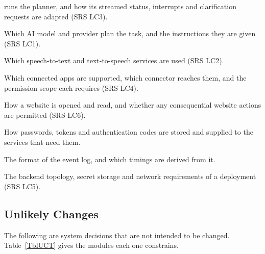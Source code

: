 \documentclass[12pt, titlepage]{article}
\newcounter{acnum}
\newcommand{\actheacnum}{AC\theacnum}
\begin{document}
\begin{description}[leftmargin=1.2cm]
runs the planner, and how its streamed status, interrupts and clarification
requests are adapted (SRS LC3).
\item[\refstepcounter{acnum} \actheacnum \label{acModel}:] Which AI model and
provider plan the task, and the instructions they are given (SRS LC1).
\item[\refstepcounter{acnum} \actheacnum \label{acSpeech}:] Which speech-to-text
and text-to-speech services are used (SRS LC2).
\item[\refstepcounter{acnum} \actheacnum \label{acAccount}:] Which connected apps
are supported, which connector reaches them, and the permission scope each
requires (SRS LC4).
\item[\refstepcounter{acnum} \actheacnum \label{acWeb}:] How a website is opened
and read, and whether any consequential website actions are permitted (SRS LC6).
\item[\refstepcounter{acnum} \actheacnum \label{acCreds}:] How passwords, tokens
and authentication codes are stored and supplied to the services that need them.
\item[\refstepcounter{acnum} \actheacnum \label{acLog}:] The format of the
event log, and which timings are derived from it.
\item[\refstepcounter{acnum} \actheacnum \label{acConfig}:] The backend topology,
secret storage and network requirements of a deployment (SRS LC5).
\end{description}

\subsection{Unlikely Changes} \label{SecUchange}

The following are system decisions that are not intended to be changed. 
Table~\ref{TblUCT} gives the modules each one constrains.
\end{document}

